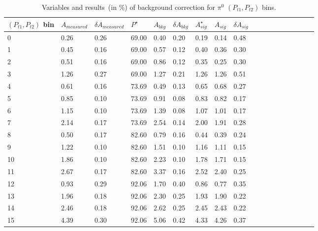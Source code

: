 \begin{table}[H]\footnotesize
\centering
\begin{tabular}{|l|l|l|l|l|l|l|l|l|l|l|l|l|l|l|l|l|l|}
\\ \hline
$(P_{t1},P_{t2})$ bin & $A_{measured}$ & $\delta A_{measured}$ & $P^{\star}$ & $A_{bkg}$ & $\delta A_{bkg}$ & $A_{sig}^{\star}$ & $ A_{sig}$  & $\delta A_{sig}$ \\ \hline
0 & 0.26 & 0.26 & 69.00 & 0.40 & 0.20 & 0.19 & 0.14 & 0.48 \\ \hline 
1 & 0.45 & 0.16 & 69.00 & 0.57 & 0.12 & 0.40 & 0.36 & 0.30 \\ \hline 
2 & 0.51 & 0.16 & 69.00 & 0.86 & 0.12 & 0.35 & 0.25 & 0.30 \\ \hline 
3 & 1.26 & 0.27 & 69.00 & 1.27 & 0.21 & 1.26 & 1.26 & 0.51 \\ \hline 
4 & 0.61 & 0.16 & 73.69 & 0.49 & 0.13 & 0.65 & 0.68 & 0.27 \\ \hline 
5 & 0.85 & 0.10 & 73.69 & 0.91 & 0.08 & 0.83 & 0.82 & 0.17 \\ \hline 
6 & 1.15 & 0.10 & 73.69 & 1.39 & 0.08 & 1.07 & 1.01 & 0.17 \\ \hline 
7 & 2.14 & 0.17 & 73.69 & 2.54 & 0.14 & 2.00 & 1.91 & 0.28 \\ \hline 
8 & 0.50 & 0.17 & 82.60 & 0.79 & 0.16 & 0.44 & 0.39 & 0.24 \\ \hline 
9 & 1.22 & 0.10 & 82.60 & 1.51 & 0.10 & 1.16 & 1.11 & 0.15 \\ \hline 
10 & 1.86 & 0.10 & 82.60 & 2.23 & 0.10 & 1.78 & 1.71 & 0.15 \\ \hline 
11 & 2.67 & 0.17 & 82.60 & 3.37 & 0.16 & 2.52 & 2.40 & 0.25 \\ \hline 
12 & 0.93 & 0.29 & 92.06 & 1.70 & 0.40 & 0.86 & 0.77 & 0.35 \\ \hline 
13 & 1.96 & 0.18 & 92.06 & 2.30 & 0.25 & 1.93 & 1.90 & 0.22 \\ \hline 
14 & 2.46 & 0.18 & 92.06 & 2.62 & 0.25 & 2.45 & 2.43 & 0.22 \\ \hline 
15 & 4.39 & 0.30 & 92.06 & 5.06 & 0.42 & 4.33 & 4.26 & 0.37 \\ \hline 
\end{tabular}
\caption{Variables and results~(in $\%$) of background correction for $\pi^0$ $(P_{t1},P_{t2})$ bins.}
\label{tab:comptbkgcor}
\end{table}  

